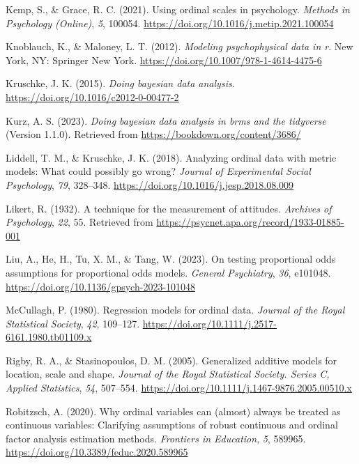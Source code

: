 \documentclass[
  man,floatsintext]{apa6}
\newlength{\cslhangindent}
\newenvironment{CSLReferences}[2] %
 {\begin{list}{}{%
  \setlength{\itemindent}{0pt}
  \setlength{\leftmargin}{0pt}
  \setlength{\parsep}{0pt}
  \ifodd #1
   \setlength{\leftmargin}{\cslhangindent}
   \setlength{\itemindent}{-1\cslhangindent}
  \fi
  \setlength{\itemsep}{#2\baselineskip}}}
 {\end{list}}
\begin{document}
\begin{CSLReferences}{1}{0}
Kemp, S., \& Grace, R. C. (2021). Using ordinal scales in psychology. \emph{Methods in Psychology (Online)}, \emph{5}, 100054. \url{https://doi.org/10.1016/j.metip.2021.100054}

Knoblauch, K., \& Maloney, L. T. (2012). \emph{Modeling psychophysical data in r}. New York, NY: Springer New York. \url{https://doi.org/10.1007/978-1-4614-4475-6}

Kruschke, J. K. (2015). \emph{Doing bayesian data analysis}. \url{https://doi.org/10.1016/c2012-0-00477-2}

Kurz, A. S. (2023). \emph{Doing bayesian data analysis in brms and the tidyverse} (Version 1.1.0). Retrieved from \url{https://bookdown.org/content/3686/}

Liddell, T. M., \& Kruschke, J. K. (2018). Analyzing ordinal data with metric models: What could possibly go wrong? \emph{Journal of Experimental Social Psychology}, \emph{79}, 328--348. \url{https://doi.org/10.1016/j.jesp.2018.08.009}

Likert, R. (1932). A technique for the measurement of attitudes. \emph{Archives of Psychology}, \emph{22}, 55. Retrieved from \url{https://psycnet.apa.org/record/1933-01885-001}

Liu, A., He, H., Tu, X. M., \& Tang, W. (2023). On testing proportional odds assumptions for proportional odds models. \emph{General Psychiatry}, \emph{36}, e101048. \url{https://doi.org/10.1136/gpsych-2023-101048}

McCullagh, P. (1980). Regression models for ordinal data. \emph{Journal of the Royal Statistical Society}, \emph{42}, 109--127. \url{https://doi.org/10.1111/j.2517-6161.1980.tb01109.x}

Rigby, R. A., \& Stasinopoulos, D. M. (2005). Generalized additive models for location, scale and shape. \emph{Journal of the Royal Statistical Society. Series C, Applied Statistics}, \emph{54}, 507--554. \url{https://doi.org/10.1111/j.1467-9876.2005.00510.x}

Robitzsch, A. (2020). Why ordinal variables can (almost) always be treated as continuous variables: Clarifying assumptions of robust continuous and ordinal factor analysis estimation methods. \emph{Frontiers in Education}, \emph{5}, 589965. \url{https://doi.org/10.3389/feduc.2020.589965}


\end{CSLReferences}
\end{document}
